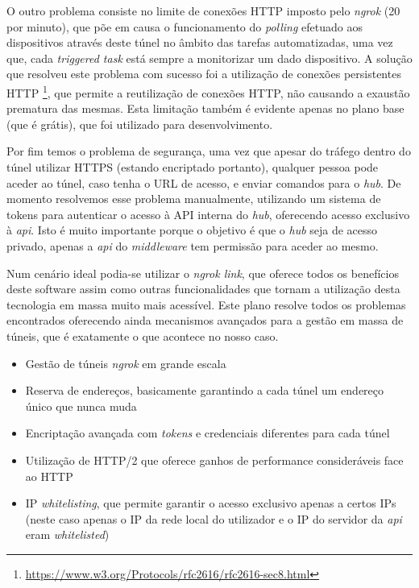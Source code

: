 O outro problema consiste no limite de conexões HTTP imposto pelo \textit{ngrok} (20 por minuto), que põe em causa o funcionamento do \textit{polling} efetuado aos dispositivos através deste túnel no âmbito das tarefas automatizadas, uma vez que, cada \textit{triggered task} está sempre a monitorizar um dado dispositivo. A solução que resolveu este problema com sucesso foi a utilização de conexões persistentes HTTP \footnote{\url{https://www.w3.org/Protocols/rfc2616/rfc2616-sec8.html}}, que permite a reutilização de conexões HTTP, não causando a exaustão prematura das mesmas. Esta limitação também é evidente apenas no plano base (que é grátis), que foi utilizado para desenvolvimento.

Por fim temos o problema de segurança, uma vez que apesar do tráfego dentro do túnel utilizar HTTPS (estando encriptado portanto), qualquer pessoa pode aceder ao túnel, caso tenha o URL de acesso, e enviar comandos para o \textit{hub}. De momento resolvemos esse problema manualmente, utilizando um sistema de tokens para autenticar o acesso à API interna do \textit{hub}, oferecendo acesso exclusivo à \textit{api}. Isto é muito importante porque o objetivo é que o \textit{hub} seja de acesso privado, apenas a \textit{api} do \textit{middleware} tem permissão para aceder ao mesmo.

Num cenário ideal podia-se utilizar o \textit{ngrok link}, que oferece todos os benefícios deste software assim como outras funcionalidades que tornam a utilização desta tecnologia em massa muito mais acessível. Este plano resolve todos os problemas encontrados oferecendo ainda mecanismos avançados para a gestão em massa de túneis, que é exatamente o que acontece no nosso caso.
\begin{itemize}
    \item Gestão de túneis \textit{ngrok} em grande escala
    \item Reserva de endereços, basicamente garantindo a cada túnel um endereço único que nunca muda
    \item Encriptação avançada com \textit{tokens} e credenciais diferentes para cada túnel
    \item Utilização de HTTP/2 que oferece ganhos de performance consideráveis face ao HTTP
    \item IP \textit{whitelisting}, que permite garantir o acesso exclusivo apenas a certos IPs (neste caso apenas o IP da rede local do utilizador e o IP do servidor da \textit{api} eram \textit{whitelisted})
\end{itemize}

